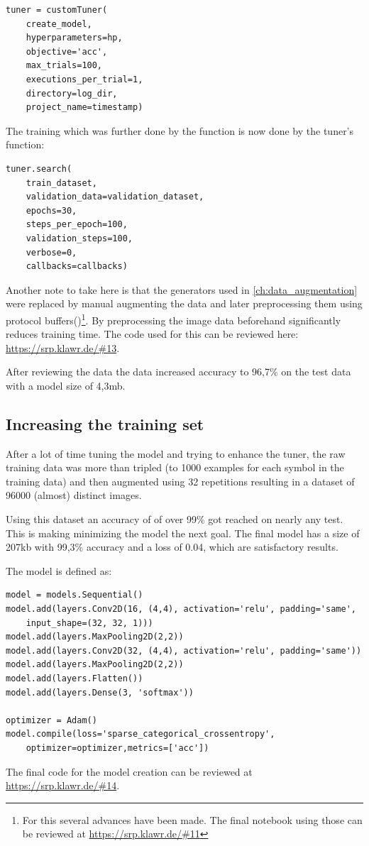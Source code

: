 \begin{lstlisting}
tuner = customTuner(
    create_model,
    hyperparameters=hp,
    objective='acc',
    max_trials=100,
    executions_per_trial=1,
    directory=log_dir,
    project_name=timestamp)
\end{lstlisting}

The training which was further done by the  function is now done by the tuner's  function:

\begin{lstlisting}
tuner.search(
    train_dataset,
    validation_data=validation_dataset,
    epochs=30,
    steps_per_epoch=100,
    validation_steps=100,
    verbose=0,
    callbacks=callbacks)
\end{lstlisting}

Another note to take here is that the generators used in \ref{ch:data_augmentation} were replaced by manual augmenting the data and later preprocessing them using protocol buffers()\footnote{For this several advances have been made. The final notebook using those can be reviewed at \url{https://srp.klawr.de/\#11}}.
By preprocessing the image data beforehand significantly reduces training time.
The code used for this can be reviewed here: \url{https://srp.klawr.de/\#13}.

After reviewing the data the data increased accuracy to 96,7\% on the test data with a model size of 4,3mb.

\subsection{Increasing the training set}

After a lot of time tuning the model and trying to enhance the tuner, the raw training data was more than tripled (to 1000 examples for each symbol in the training data) and then augmented using 32 repetitions resulting in a dataset of 96000 (almost) distinct images.

Using this dataset an accuracy of of over 99\% got reached on nearly any test. This is making minimizing the model the next goal.
The final model has a size of 207kb with 99,3\% accuracy and a loss of 0.04, which are satisfactory results.

The model is defined as:
\begin{lstlisting}
model = models.Sequential()
model.add(layers.Conv2D(16, (4,4), activation='relu', padding='same',
    input_shape=(32, 32, 1)))
model.add(layers.MaxPooling2D(2,2))
model.add(layers.Conv2D(32, (4,4), activation='relu', padding='same'))
model.add(layers.MaxPooling2D(2,2))
model.add(layers.Flatten())
model.add(layers.Dense(3, 'softmax'))

optimizer = Adam()
model.compile(loss='sparse_categorical_crossentropy',
    optimizer=optimizer,metrics=['acc'])
\end{lstlisting}

The final code for the model creation can be reviewed at \url{https://srp.klawr.de/\#14}.